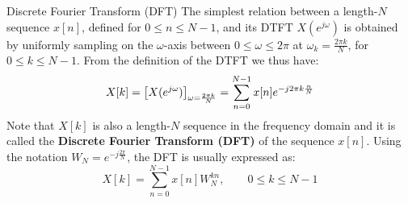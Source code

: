 \documentclass[../../main/main.tex]{subfiles}
\begin{document}
\begin{definition}{Discrete Fourier Transform (DFT)}{}
    The simplest relation between a length-\( N \) sequence \( x[n] \), defined for \( 0 \le n \le N-1 \), and its DTFT \( X(e^{j\omega}) \) is obtained by uniformly sampling on the \( \omega \)-axis between \( 0 \le \omega \le 2\pi \) at \( \omega_{k} = \frac{2\pi k}{N} \), for \( 0 \le k \le N-1 \). From the definition of the DTFT we thus have:
    \begin{equation}
        X[k]
        =
        \qty[X(e^{j\omega})]_{\omega=\frac{2\pi k}{N}}
        =
        \sum_{n=0}^{N-1} x[n]e^{-j 2\pi k \frac{n}{N}}
        \label{eq:L12_S06_1}
    \end{equation}
    Note that \( X[k] \) is also a length-\( N \) sequence in the frequency domain and it is called the \textbf{Discrete Fourier Transform (DFT)} of the sequence \( x[n] \). Using the notation \( W_{N} = e^{-j \frac{2\pi}{N}} \), the DFT is usually expressed as:
    \begin{equation}
        X[k]
        =
        \sum_{n=0}^{N-1} x[n] W_{N}^{kn},
        \qquad
        0 \le k \le N-1
        \label{eq:L12_S07_1}
    \end{equation}
\end{definition}
\end{document}
